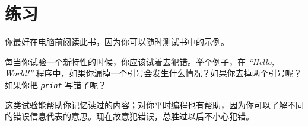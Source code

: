 \section{练习}

\begin{exercise}


你最好在电脑前阅读此书，因为你可以随时测试书中的示例。


每当你试验一个新特性的时候，你应该试着去犯错。举个例子，在 {\em “Hello, World!”} 程序中，如果你漏掉一个引号会发生什么情况？如果你去掉两个引号呢？如果你把 {\em \lstinline{print}} 写错了呢？
  


这类试验能帮助你记忆读过的内容；对你平时编程也有帮助，因为你可以了解不同的错误信息代表的意思。现在故意犯错误，总胜过以后不小心犯错。



\end{exercise}
